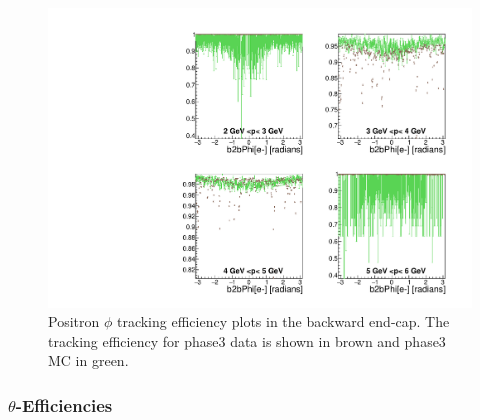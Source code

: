 \documentclass[a4paper,11pt,twosided,final,german,openbib,pdftex,listof=totoc,bibliography=totoc]{scrbook}
\begin{document}
\begin{figure}[!htbp]
	\centering
	\includegraphics[width=\textwidth]{Plots/master3/xPMPhiepECP3}
	\caption[Momentum $\phi$ Positron Backward End-Cap Efficiency Phase3]{Positron $\phi$ tracking efficiency plots in the backward end-cap. The tracking efficiency for phase3 data is shown in brown and phase3 MC in green.}
	
	\label{plt:xPMPhiepEC3}
\end{figure}

\newpage

\subsubsection{$\theta$-Efficiencies}
\end{document}
